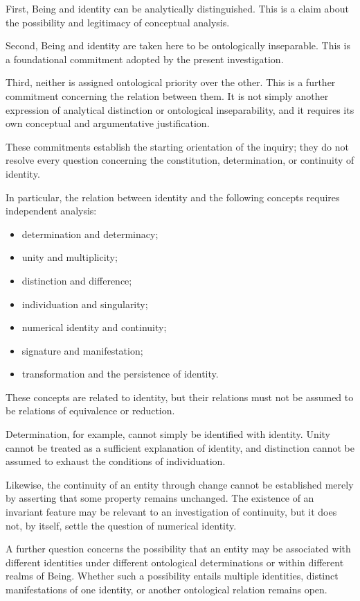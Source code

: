 First, Being and identity can be analytically
distinguished. This is a claim about the possibility
and legitimacy of conceptual analysis.

Second, Being and identity are taken here to be
ontologically inseparable. This is a foundational
commitment adopted by the present investigation.

Third, neither is assigned ontological priority over
the other. This is a further commitment concerning
the relation between them. It is not simply another
expression of analytical distinction or ontological
inseparability, and it requires its own conceptual
and argumentative justification.

These commitments establish the starting orientation
of the inquiry; they do not resolve every question
concerning the constitution, determination, or
continuity of identity.

In particular, the relation between identity and
the following concepts requires independent analysis:

\begin{itemize}
    \item determination and determinacy;
    \item unity and multiplicity;
    \item distinction and difference;
    \item individuation and singularity;
    \item numerical identity and continuity;
    \item signature and manifestation;
    \item transformation and the persistence of identity.
\end{itemize}

These concepts are related to identity, but their
relations must not be assumed to be relations of
equivalence or reduction.

Determination, for example, cannot simply be
identified with identity. Unity cannot be treated
as a sufficient explanation of identity, and
distinction cannot be assumed to exhaust the
conditions of individuation.

Likewise, the continuity of an entity through change
cannot be established merely by asserting that
some property remains unchanged. The existence
of an invariant feature may be relevant to an
investigation of continuity, but it does not,
by itself, settle the question of numerical identity.

A further question concerns the possibility that
an entity may be associated with different identities
under different ontological determinations or within
different realms of Being. Whether such a possibility
entails multiple identities, distinct manifestations
of one identity, or another ontological relation
remains open.

